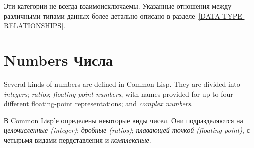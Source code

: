 Эти категории не всегда взаимоисключаемы. Указанные отношения
между различными типами данных более детально описано в
разделе~\ref{DATA-TYPE-RELATIONSHIPS}. 


\section{Numbers Числа}

Several kinds of numbers are defined in Common Lisp.
They are divided into \emph{integers}; \emph{ratios};
\emph{floating-point numbers}, with names provided for
up to four different floating-point representations; and \emph{complex numbers}.

В Common Lisp'е определены некоторые виды чисел. Они
подразделяются на \emph{целочисленные (integer)}; \emph{дробные
(ratios)}; \emph{плавающей точкой (floating-point)}, с
четырьмя видами пердставления и \emph{комплексные}.

